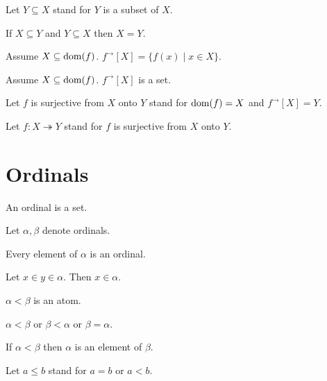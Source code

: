 \documentclass{article}
\newcommand{\image}[2]{#1^{\to}[#2]}
\newcommand{\surjects}{\twoheadrightarrow}
\begin{document}
\begin{forthel}
    Let $Y\subseteq X$ stand for $Y$ is a subset of $X$.

    \begin{axiom}[Extensionality]
      If $X\subseteq Y$ and $Y\subseteq X$ then $X = Y$.
    \end{axiom}

    \begin{definition}
      Assume $X\subseteq \operatorname{dom}(f)$.
      $\image{f}{X} = \{f(x) \mid x \in X\}$.
    \end{definition}

    \begin{axiom}
      Assume $X\subseteq \operatorname{dom}(f)$.
      $\image{f}{X}$ is a set.
    \end{axiom}

    Let $f$ is surjective from $X$ onto $Y$ stand for $\operatorname{dom}(f) = X$ and $\image{f}{X} = Y$.

    Let $f : X \surjects Y$ stand for $f$ is surjective from $X$ onto $Y$.
  \end{forthel}

\section{Ordinals}

  \begin{forthel}
    \begin{signature}
      An ordinal is a set.
    \end{signature}

    Let $\alpha, \beta$ denote ordinals.

    \begin{axiom}
      Every element of $\alpha$ is an ordinal.
    \end{axiom}

    \begin{axiom}[Transitivity]
      Let $x\in y\in \alpha$.
      Then $x\in \alpha$.
    \end{axiom}

    \begin{signature}
      $\alpha < \beta$ is an atom.
    \end{signature}

    \begin{axiom}
      $\alpha < \beta$ or $\beta < \alpha$ or $\beta = \alpha$.
    \end{axiom}

    \begin{axiom}
      If $\alpha < \beta$ then $\alpha$ is an element of $\beta$.
    \end{axiom}

    Let $a \leq b$ stand for $a = b$ or $a < b$.
  \end{forthel}
\end{document}
